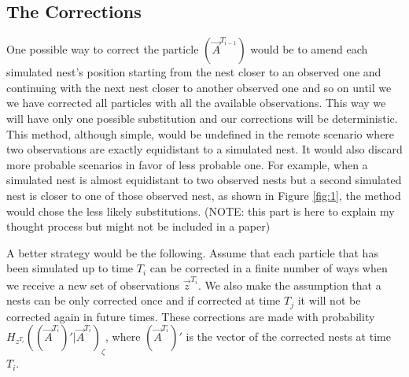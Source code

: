 {\color{red}
\subsection{The Corrections} \label{subsec:corrections}

One possible way to correct the particle $(\vec{A}^{T_{i-1}})$ would be to amend each simulated nest's position starting from the nest closer to an observed one and continuing with the next nest closer to another observed one and so on until we we have corrected all particles with all the available observations. This way we will have only one possible substitution and our corrections will be deterministic. This method, although simple, would be undefined in the remote scenario where two observations are exactly equidistant to a simulated nest. It would also discard more probable scenarios in favor of less probable one. For example, when a simulated nest is almost equidistant to two observed nests but a second simulated nest is closer to one of those observed nest, as shown in Figure \ref{fig:1}, the method would chose the less likely substitutions. (NOTE: this part is here to explain my thought process but might not be included in a paper)

\begin{figure*}
\centering
\caption{[A] shows the shortest distance substitution in the deterministic scenario. [B] shows the more likely substitution that would be discarded in the deterministic scenario.}
\label{fig:1}
\end{figure*}

A better strategy would be the following. Assume that each particle that has been simulated up to time $T_i$ can be corrected in a finite number of ways when we receive a new set of observations $\vec{z}^{T_i}$. We also make the assumption that a nests can be only corrected once and if corrected at time $T_j$ it will not be corrected again in future times. These corrections are made with probability $H_{z^{T_i}}((\vec{A}^{T_i})' | \vec{A}^{T_i})_{\zeta}$, where $(\vec{A}^{T_i})'$ is the vector of the corrected nests at time $T_i$.

}
